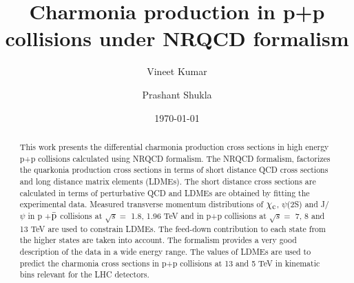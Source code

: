 \documentclass[aps,prc,preprint,superscriptaddress,showpacs,showkeys,amsmath]{revtex4-1}
\begin{document}
\newcommand{\Jpsi}{J/\psi}
\newcommand{\pT}{p_{T}}
\newcommand{\calO}{{\cal{O}}}
\newcommand{\barQ}{{\bar{Q}}}
\newcommand{\barq}{{\bar{q}}}
\newcommand{\barc}{{\bar{c}}}
\newcommand{\barb}{{\bar{b}}}
\newcommand{\baru}{\bar{u}}
\newcommand{\barv}{\bar{v}}
\newcommand{\barup}{\bar{u}_{+}}
\newcommand{\barum}{\bar{u}_{-}}
\newcommand{\barvp}{\bar{v}_{+}}
\newcommand{\barvm}{\bar{v}_{-}}
\newcommand{\charm}{{\rm{charm}}}
\newcommand{\bottom}{{\rm{bottom}}}
\newcommand{\cs}{{\hat{s}}}
\newcommand{\ct}{{\hat{t}}}
\newcommand{\cu}{{\hat{u}}}
\newcommand{\alphas}{{\alpha_{s}}}
\newcommand{\shat}{\hat{\rm s}}
\newcommand{\that}{\hat{\rm t}}
\newcommand{\uhat}{\hat{\rm u}}
\newcommand{\zhat}{\hat{\rm z}}
\newcommand{\CA}{{\cal A}}
\newcommand{\Qbar}{{\overline Q}}
\newcommand{\QQbaroctetgen}{{Q\Qbar[ ^{2S+1}L_J^{(8)}]}}
\newcommand{\QQbaroctetsingS}{{Q\Qbar[ ^1S_0^{(8)}]}}
\newcommand{\QQbaroctettripP}{{Q\Qbar[ ^3P_J^{(8)}]}}
\newcommand{\QQbaroctettripPone}{{Q\Qbar[ ^3P_1^{(8)}]}}
\def\QQbaroctettripS{Q\Qbar[ ^3S_1^{(8)}]}
\def\QQbaroctetPzero{Q\Qbar[ ^3P_0^{(8)}]}
\def\QQbaroctetPone{Q\Qbar[ ^3P_1^{(8)}]}
\def\QQbaroctetPtwo{Q\Qbar[ ^3P_2^{(8)}]}
\title{{\Large Charmonia production in p+p collisions under NRQCD formalism}} 
\author{\large Vineet Kumar}
\author{\large Prashant Shukla}
\date{\today}

\begin{abstract}
  This work presents the differential charmonia production cross sections in high 
  energy p+p collisions calculated  using NRQCD formalism. The NRQCD formalism, 
  factorizes the quarkonia production cross sections in terms of short distance QCD 
  cross sections and long distance matrix elements (LDMEs). The short distance cross
  sections are calculated in terms of perturbative QCD and LDMEs are obtained by 
  fitting the experimental data. Measured transverse momentum distributions of 
  $\chi_{\rm c}$, $\psi$(2S) and J/$\psi$ in p +{$\bar {\rm p}$} collisions at $\sqrt{s}=$ 1.8, 1.96 TeV 
  and in p+p collisions at $\sqrt{s}=$  7, 8 and 13 TeV are used to constrain LDMEs. The feed-down 
  contribution to each state from the higher states are taken into account.
  The formalism provides a very good description of the data in a wide energy range. 
  The values of LDMEs are used to predict the charmonia cross sections in p+p collisions 
  at 13 and 5 TeV in kinematic bins relevant for the LHC detectors. 
\end{abstract}
\end{document}
